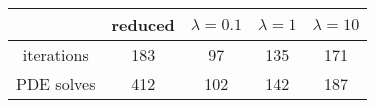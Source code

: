 \begin{tabular}{ccccc}
& reduced & $\lambda = 0.1$ & $\lambda = 1$ & $\lambda = 10$ \\
\hline
iterations & 183 & 97 & 135 & 171 \\
PDE solves & 412 & 102 & 142 & 187 \\
\hline
\end{tabular}
